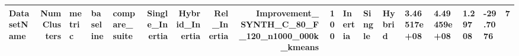 \begin{tabular}{lrlllrrrrr}
\toprule
DatasetName & NumClusters & metric & baseline & compare_suite & Single_Inertia & Hybrid_Inertia & Rel_Inertia & Improvement_%
\midrule
SYNTH_C_80_F_120_n1000_000k_kmeans & 100 & Inertia & Single & Hybrid & 3.46517e+08 & 4.49459e+08 & 1.29708 & -29.7076 & 7 \\
\bottomrule
\end{tabular}
